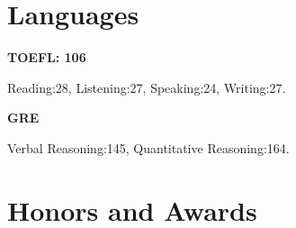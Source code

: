 \documentclass[letterpaper]{article}
\renewenvironment{itemize}{
  \begin{list}{}{
    \setlength{\leftmargin}{1.5em}
  }
}{
  \end{list}
}
\begin{document}
\section*{Languages}

\begin{itemize}
\item \textbf{TOEFL: 106}
\item Reading:28, Listening:27, Speaking:24, Writing:27.
\item \textbf{GRE}
\item Verbal Reasoning:145, Quantitative Reasoning:164.
\end{itemize}

\section*{Honors and Awards}
\end{document}
